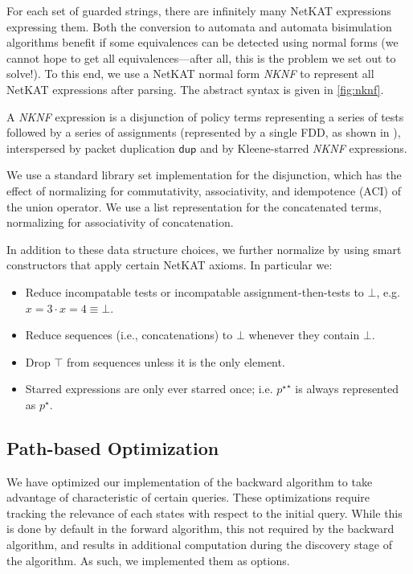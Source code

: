 \documentclass[acmsmall,dvipsnames,nonacm]{acmart}
\newcommand\dup{\mathsf{dup}}
\newcommand\NetKAT{\textsf{NetKAT}\xspace}
\begin{document}
For each set of guarded strings, there are infinitely many \NetKAT
expressions expressing them.  Both the conversion to automata and
automata bisimulation algorithms benefit if some equivalences can be
detected using normal forms (we cannot hope to get all
equivalences---after all, this is the problem we set out to solve!).
To this end, we use a \NetKAT normal form \emph{NKNF} to represent all
\NetKAT expressions after parsing. The abstract syntax is given in
\cref{fig:nknf}.

A \emph{NKNF} expression is a disjunction of policy terms representing
a series of tests followed by a series of assignments (represented by
a single FDD, as shown in ), interspersed by packet
duplication $\dup$ and by Kleene-starred \emph{NKNF} expressions.

We use a standard library set implementation for the disjunction,
which has the effect of normalizing for commutativity, associativity,
and idempotence (ACI) of the union operator. We use a list
representation for the concatenated terms, normalizing for
associativity of concatenation.

In addition to these data structure choices, we further normalize by
using smart constructors that apply certain \NetKAT axioms. In
particular we:
\begin{itemize}
  \item Reduce incompatable tests or incompatable assignment-then-tests to
  $\bot$, e.g. $x=3\cdot x=4 \equiv \bot$.
  \item Reduce sequences (i.e., concatenations) to $\bot$ whenever they contain
  $\bot$.
  \item Drop $\top$ from sequences unless it is the only element.
  \item Starred expressions are only ever starred once; i.e. ${p^\star}^\star$
    is always represented as $p^\star$.
\end{itemize}

\subsection{Path-based Optimization}

We have optimized our implementation of the backward algorithm to take
advantage of characteristic of certain queries. These optimizations
require tracking the relevance of each states with respect to the
initial query. While this is done by default in the forward algorithm,
this not required by the backward algorithm, and results in additional
computation during the discovery stage of the algorithm. As such, we
implemented them as options.
\end{document}
